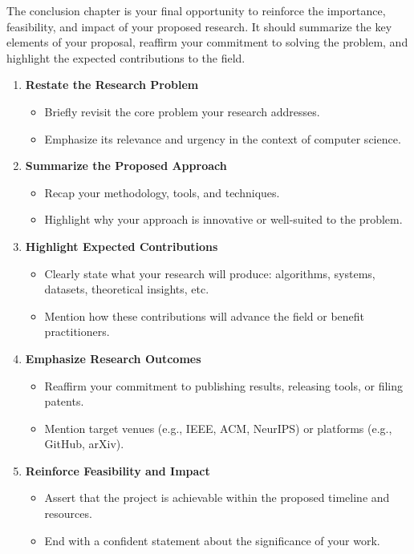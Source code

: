 \documentclass[PCOM,Proposal,Review]{mpThesis}
\newcommand{\Hd}[1]{{\color{SteelBlue}\bf#1}}
\begin{document}
\begin{MainMatter}
\begin{Remark}
The conclusion chapter is your final opportunity to reinforce the importance, feasibility, and impact of your proposed research.
It should summarize the key elements of your proposal, reaffirm your commitment to solving the problem, and highlight the expected contributions to the field.
\begin{enumerate}
\item \Hd{Restate the Research Problem}
  \begin{itemize}
  \item Briefly revisit the core problem your research addresses.

  \item Emphasize its relevance and urgency in the context of computer science.
  \end{itemize}

\item \Hd{Summarize the Proposed Approach}
  \begin{itemize}
  \item Recap your methodology, tools, and techniques.

  \item Highlight why your approach is innovative or well-suited to the problem.
  \end{itemize}

\item \Hd{Highlight Expected Contributions}
  \begin{itemize}
  \item Clearly state what your research will produce: algorithms, systems, datasets, theoretical insights, etc.

  \item Mention how these contributions will advance the field or benefit practitioners.
  \end{itemize}

\item \Hd{Emphasize Research Outcomes}
  \begin{itemize}
  \item Reaffirm your commitment to publishing results, releasing tools, or filing patents.

  \item Mention target venues (e.g., IEEE, ACM, NeurIPS) or platforms (e.g., GitHub, arXiv).
  \end{itemize}

\item \Hd{Reinforce Feasibility and Impact}
  \begin{itemize}
  \item Assert that the project is achievable within the proposed timeline and resources.

  \item End with a confident statement about the significance of your work.
  \end{itemize}
\end{enumerate}
\end{Remark}
\end{MainMatter}
\end{document}
